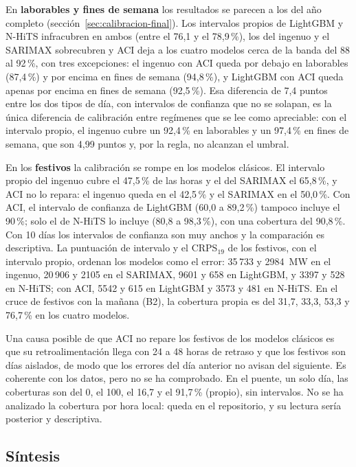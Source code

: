 En \textbf{laborables y fines de semana} los resultados se parecen a los del año
completo (sección~\ref{sec:calibracion-final}). Los intervalos propios de
LightGBM y N-HiTS infracubren en ambos (entre el 76,1 y el 78,9\,\%), los del
ingenuo y el SARIMAX sobrecubren y ACI deja a los cuatro modelos cerca de la
banda del 88 al 92\,\%, con tres excepciones: el ingenuo con ACI queda por
debajo en laborables (87,4\,\%) y por encima en fines de semana (94,8\,\%), y
LightGBM con ACI queda apenas por encima en fines de semana (92,5\,\%). Esa diferencia de 7,4
puntos entre los dos tipos de día, con intervalos de confianza que no se
solapan, es la única diferencia de calibración entre regímenes que se lee como
apreciable: con el intervalo propio, el ingenuo cubre un 92,4\,\% en laborables
y un 97,4\,\% en fines de semana, que son 4,99 puntos y, por la regla, no
alcanzan el umbral.

En los \textbf{festivos} la calibración se rompe en los modelos clásicos. El
intervalo propio del ingenuo cubre el 47,5\,\% de las horas y el del SARIMAX el
65,8\,\%, y ACI no lo repara: el ingenuo queda en el 42,5\,\% y el SARIMAX en el
50,0\,\%. Con ACI, el intervalo de confianza de LightGBM (60,0 a 89,2\,\%)
tampoco incluye el 90\,\%; solo el de N-HiTS lo incluye (80,8 a 98,3\,\%), con
una cobertura del 90,8\,\%. Con 10 días los intervalos de confianza son muy
anchos y la comparación es descriptiva. La puntuación de intervalo y el
CRPS$_{19}$ de los festivos, con el intervalo propio, ordenan los modelos como
el error: 35\,733 y 2984~MW en el ingenuo, 20\,906 y 2105 en el SARIMAX, 9601 y
658 en LightGBM, y 3397 y 528 en N-HiTS; con ACI, 5542 y 615 en LightGBM y 3573
y 481 en N-HiTS. En el cruce de festivos con la mañana (B2), la cobertura
propia es del 31,7, 33,3, 53,3 y 76,7\,\% en los cuatro modelos.

Una causa posible de que ACI no repare los festivos de los modelos clásicos es
que su retroalimentación llega con 24 a 48 horas de retraso y que los festivos
son días aislados, de modo que los errores del día anterior no avisan del
siguiente. Es coherente con los datos, pero no se ha comprobado. En el puente,
un solo día, las coberturas son del 0, el 100, el 16,7 y el 91,7\,\% (propio),
sin intervalos. No se ha analizado la cobertura por hora local: queda en el
repositorio, y su lectura sería posterior y descriptiva.

\subsection{Síntesis}\label{sec:desg-sintesis}

